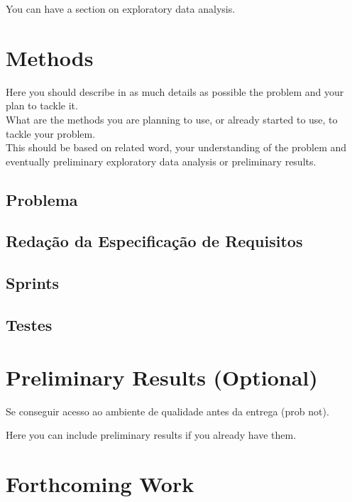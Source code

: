 \documentclass[sigplan]{acmart}
\begin{document}
You can have a section on exploratory data analysis. \\

\section{Methods} \label{sec:methods}

Here you should describe in as much details as possible the problem and your plan to tackle it. \\

What are the methods you are planning to use, or already started to use, to tackle your problem. \\

This should be based on related word, your understanding of the problem and eventually preliminary exploratory data analysis or preliminary results.

\subsection{Problema} %

\subsection{Redação da Especificação de Requisitos}

\subsection{Sprints}

\subsection{Testes}

\section{Preliminary Results (Optional)} \label{sec:preliminaryresults}

Se conseguir acesso ao ambiente de qualidade antes da entrega (prob not).

Here you can include preliminary results if you already have them.

\section{Forthcoming Work} \label{sec:forthcomingwork}
\end{document}
